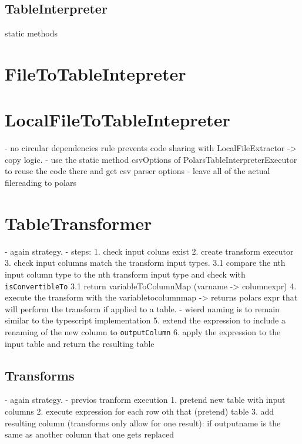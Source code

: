 \subsection{TableInterpreter} %
static methods


\section{FileToTableIntepreter}

\section{LocalFileToTableIntepreter}
- no circular dependencies rule prevents code sharing with LocalFileExtractor -> copy logic.
- use the static method csvOptions of PolarsTableInterpreterExecutor to reuse the code there and get csv parser options
- leave all of the actual filereading to polars


\section{TableTransformer}
- again strategy.
- steps:
1. check input coluns exist
2. create transform executor
3. check input columns match the transform input types.
3.1 compare the nth input column type to the nth transform input type and check with \Verb|isConvertibleTo|
3.1 return variableToColumnMap (varname -> columnexpr)
4. execute the transform with the variabletocolumnmap -> returns polars expr that will perform the transform if applied to a table.
- wierd naming is to remain similar to the typescript implementation
5. extend the expression to include a renaming of the new column to \Verb|outputColumn|
6. apply the expression to the input table and return the resulting table

\subsection{Transforms}
- again strategy.
- previos tranform execution
1. pretend new table with input columns
2. execute expression for each row oth that (pretend) table
3. add resulting column (transforms only allow for one result): if outputname is the same as another column that one gets replaced

